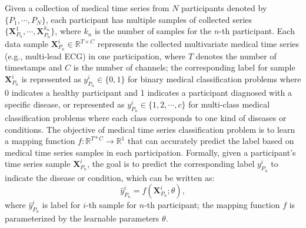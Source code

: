 Given a collection of medical time series from $N$ participants denoted by $\{P_1, \cdots, P_N \}$, each participant has multiple samples of collected series $\{\mathbf{X}^{1}_{P_n}, \cdots, \mathbf{X}^{k_n}_{P_n}\}$, where $k_n$ is the number of samples for the $n$-th participant. Each data sample $\mathbf{X}^{i}_{P_n} \in \mathbb{R}^{T \times C}$ represents the collected multivariate medical time series (e.g., multi-lead ECG) in one participation, where $T$ denotes the number of timestamps and $C$ is the number of channels; the corresponding label for sample $\mathbf{X}^{i}_{P_n}$ is represented as $y^{i}_{P_n} \in \{0, 1\}$ for binary medical classification problems where  0 indicates a healthy participant and 1 indicates a participant diagnosed with a specific disease, or represented as $y^{i}_{P_n} \in \{1,2, \cdots, c\}$ for multi-class medical classification problems where each class corresponds to one kind of diseases or conditions.
The objective of medical time series classification problem is to learn a mapping function %
$f: \mathbb{R}^{T*C} \rightarrow \mathbb{R}^1$
that can accurately predict the label based on medical time series samples in each participation. Formally, given a participant's time series sample $\mathbf{X}^{i}_{P_n}$, the goal is to predict the corresponding label $y^i_{P_n}$ to indicate the disease or condition, which can be written as:
\begin{equation}
\hat{y}^i_{P_n} = f(\mathbf{X}^{i}_{P_n}; \theta),
\end{equation}
where $\hat{y}^i_{P_n}$ is label for $i$-th sample for $n$-th participant; the mapping function $f$ is parameterized by the learnable parameters $\theta$.


